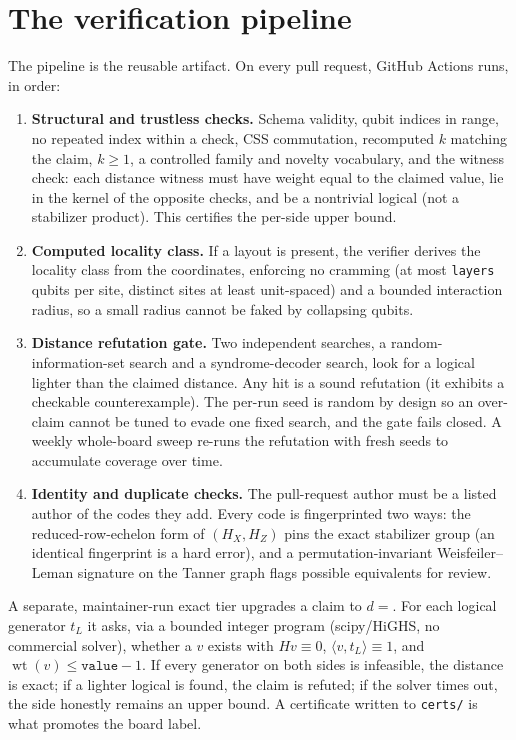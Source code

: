 \documentclass[11pt]{article}
\newcommand{\wt}{\operatorname{wt}}
\begin{document}
\section{The verification pipeline}

The pipeline is the reusable artifact. On every pull request, GitHub Actions
runs, in order:

\begin{enumerate}[label=\arabic*.,leftmargin=*,nosep]
  \item \textbf{Structural and trustless checks.} Schema validity, qubit indices
  in range, no repeated index within a check, CSS commutation, recomputed $k$
  matching the claim, $k \ge 1$, a controlled family and novelty vocabulary, and
  the witness check: each distance witness must have weight equal to the claimed
  value, lie in the kernel of the opposite checks, and be a nontrivial logical
  (not a stabilizer product). This certifies the per-side upper bound.
  \item \textbf{Computed locality class.} If a layout is present, the verifier
  derives the locality class from the coordinates, enforcing no cramming (at most
  \texttt{layers} qubits per site, distinct sites at least unit-spaced) and a
  bounded interaction radius, so a small radius cannot be faked by collapsing
  qubits.
  \item \textbf{Distance refutation gate.} Two independent searches, a
  random-information-set search and a syndrome-decoder search, look for a logical
  lighter than the claimed distance. Any hit is a sound refutation (it exhibits a
  checkable counterexample). The per-run seed is random by design so an
  over-claim cannot be tuned to evade one fixed search, and the gate fails closed.
  A weekly whole-board sweep re-runs the refutation with fresh seeds to
  accumulate coverage over time.
  \item \textbf{Identity and duplicate checks.} The pull-request author must be a
  listed author of the codes they add. Every code is fingerprinted two ways: the
  reduced-row-echelon form of $(H_X, H_Z)$ pins the exact stabilizer group (an
  identical fingerprint is a hard error), and a permutation-invariant
  Weisfeiler--Leman signature on the Tanner graph flags possible equivalents for
  review.
\end{enumerate}

A separate, maintainer-run exact tier upgrades a claim to $d =$. For each logical
generator $t_L$ it asks, via a bounded integer program (scipy/HiGHS, no
commercial solver), whether a $v$ exists with $H v \equiv 0$,
$\langle v, t_L\rangle \equiv 1$, and $\wt(v) \le \texttt{value} - 1$. If every
generator on both sides is infeasible, the distance is exact; if a lighter
logical is found, the claim is refuted; if the solver times out, the side
honestly remains an upper bound. A certificate written to \texttt{certs/} is what
promotes the board label.
\end{document}
